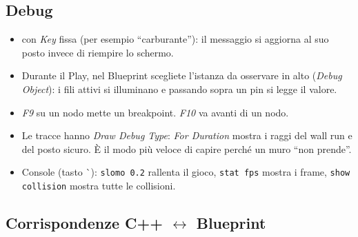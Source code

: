 \subsection{Debug}

\begin{itemize}
  \item {} con \emph{Key} fissa (per esempio ``carburante''): il messaggio si aggiorna al suo posto invece di riempire lo schermo.
  \item Durante il Play, nel Blueprint scegliete l'istanza da osservare in alto (\emph{Debug Object}): i fili attivi si illuminano e passando sopra un pin si legge il valore.
  \item \emph{F9} su un nodo mette un breakpoint. \emph{F10} va avanti di un nodo.
  \item Le tracce hanno \emph{Draw Debug Type}: \emph{For Duration} mostra i raggi del wall run e del posto sicuro. È il modo più veloce di capire perché un muro ``non prende''.
  \item Console (tasto \`{}): \texttt{slomo 0.2} rallenta il gioco, \texttt{stat fps} mostra i frame, \texttt{show collision} mostra tutte le collisioni.
\end{itemize}

\subsection{Corrispondenze C++ $\leftrightarrow$ Blueprint}


